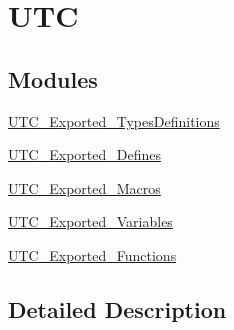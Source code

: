 \hypertarget{group___u_t_c}{}\section{U\+TC}
\label{group___u_t_c}
\subsection*{Modules}
\begin{DoxyCompactItemize}
\item 
\mbox{\hyperlink{group___u_t_c___exported___types_definitions}{U\+T\+C\+\_\+\+Exported\+\_\+\+Types\+Definitions}}
\item 
\mbox{\hyperlink{group___u_t_c___exported___defines}{U\+T\+C\+\_\+\+Exported\+\_\+\+Defines}}
\item 
\mbox{\hyperlink{group___u_t_c___exported___macros}{U\+T\+C\+\_\+\+Exported\+\_\+\+Macros}}
\item 
\mbox{\hyperlink{group___u_t_c___exported___variables}{U\+T\+C\+\_\+\+Exported\+\_\+\+Variables}}
\item 
\mbox{\hyperlink{group___u_t_c___exported___functions}{U\+T\+C\+\_\+\+Exported\+\_\+\+Functions}}
\end{DoxyCompactItemize}


\subsection{Detailed Description}
